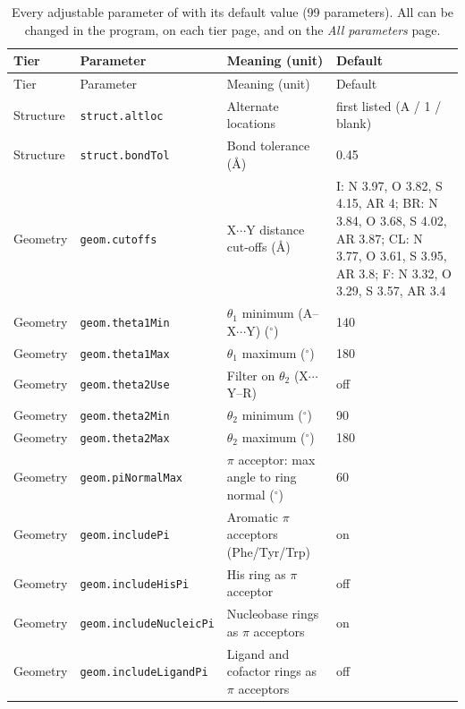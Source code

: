 {\scriptsize
\setlength{\tabcolsep}{3pt}
\begin{longtable}{llp{4.2cm}l}
\caption{Every adjustable parameter of \BX{} with its default value (99 parameters). All can be changed in the program, on each tier page, and on the \emph{All parameters} page.}\label{tab:params}\\
\toprule
Tier & Parameter & Meaning (unit) & Default\\
\midrule
\endfirsthead
\toprule
Tier & Parameter & Meaning (unit) & Default\\
\midrule
\endhead
\bottomrule
\endlastfoot
Structure & \texttt{struct.altloc} & Alternate locations & \parbox[t]{5.0cm}{\raggedright first listed (A / 1 / blank)}\\
Structure & \texttt{struct.bondTol} & Bond tolerance (\AA{}) & \parbox[t]{5.0cm}{\raggedright 0.45}\\
Geometry & \texttt{geom.cutoffs} & X$\cdots$Y distance cut-offs (\AA{}) & \parbox[t]{5.0cm}{\raggedright I: N 3.97, O 3.82, S 4.15, AR 4; BR: N 3.84, O 3.68, S 4.02, AR 3.87; CL: N 3.77, O 3.61, S 3.95, AR 3.8; F: N 3.32, O 3.29, S 3.57, AR 3.4}\\
Geometry & \texttt{geom.theta1Min} & $\theta_1$ minimum (A--X$\cdots$Y) ($^\circ$) & \parbox[t]{5.0cm}{\raggedright 140}\\
Geometry & \texttt{geom.theta1Max} & $\theta_1$ maximum ($^\circ$) & \parbox[t]{5.0cm}{\raggedright 180}\\
Geometry & \texttt{geom.theta2Use} & Filter on $\theta_2$ (X$\cdots$Y--R) & \parbox[t]{5.0cm}{\raggedright off}\\
Geometry & \texttt{geom.theta2Min} & $\theta_2$ minimum ($^\circ$) & \parbox[t]{5.0cm}{\raggedright 90}\\
Geometry & \texttt{geom.theta2Max} & $\theta_2$ maximum ($^\circ$) & \parbox[t]{5.0cm}{\raggedright 180}\\
Geometry & \texttt{geom.piNormalMax} & $\pi$ acceptor: max angle to ring normal ($^\circ$) & \parbox[t]{5.0cm}{\raggedright 60}\\
Geometry & \texttt{geom.includePi} & Aromatic $\pi$ acceptors (Phe/Tyr/Trp) & \parbox[t]{5.0cm}{\raggedright on}\\
Geometry & \texttt{geom.includeHisPi} & His ring as $\pi$ acceptor & \parbox[t]{5.0cm}{\raggedright off}\\
Geometry & \texttt{geom.includeNucleicPi} & Nucleobase rings as $\pi$ acceptors & \parbox[t]{5.0cm}{\raggedright on}\\
Geometry & \texttt{geom.includeLigandPi} & Ligand and cofactor rings as $\pi$ acceptors & \parbox[t]{5.0cm}{\raggedright off}\\

\end{longtable}}
